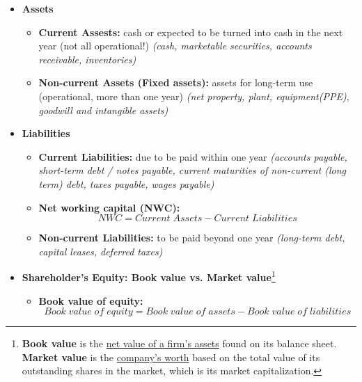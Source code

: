 \documentclass[ieeetran]{article}
\begin{document}
\begin{itemize}
  \item \textbf{Assets}
	\begin{itemize}
	  \item \textbf{Current Assests:} cash or expected to be turned into cash in the next year (not all operational!) \textit{(cash, marketable securities, accounts receivable, inventories)}
	  
	  \item \textbf{Non-current Assets (Fixed assets):} assets for long-term use (operational, more than one year) \textit{(net property, plant, equipment(PPE), goodwill and intangible assets)}
	\end{itemize}
   
\item \textbf{Liabilities}
	   \begin{itemize}
	     \item \textbf{Current Liabilities:} due to be paid within one year \textit{(accounts payable, short-term debt / notes payable, current maturities of non-current (long term) debt, taxes payable, wages payable)}
	     
	     \item \textbf{Net working capital (NWC):}
		     \large
		     \begin{equation*}
		     \boxed{NWC = Current \; Assets - Current \; Liabilities}
		     \end{equation*}
		     \normalsize
	     
	     \item \textbf{Non-current Liabilities:} to be paid beyond one year \textit{(long-term debt, capital leases, deferred taxes)}    
	   \end{itemize}

   \item \textbf{Shareholder's Equity: Book value vs. Market value}\footnote{\textbf{Book value} is the \underline{net value of a firm's assets} found on its balance sheet. \textbf{Market value} is the \underline{company's worth} based on the total value of its outstanding shares in the market, which is its market capitalization.}
	\begin{itemize}
	  \item \textbf{Book value of equity:}
		  \large
		  \begin{equation*}
		  \boxed{Book \; value \; of \; equity = 
		  Book \; value \; of \; assets - Book \; value \; of \; liabilities}
		  \end{equation*}
		  \normalsize
		  

\end{itemize}
\end{itemize}
\end{document}
